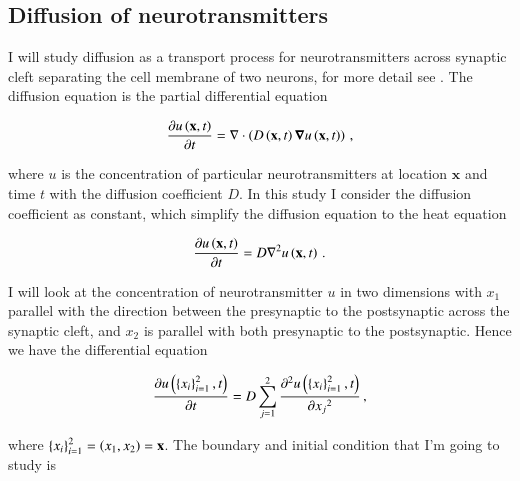 \documentclass[11pt,english,a4paper]{article}
\begin{document}
\maketitle
\begin{flushleft}

\begin{abstract}

\end{abstract}

\section{Diffusion of neurotransmitters}

I will study diffusion as a transport process for neurotransmitters  across synaptic cleft separating the cell membrane of two neurons, for more detail see \cite{project4}. The diffusion equation is the partial differential equation 

\begin{align*}
\frac{\partial u\left({\textbf{x},t}\right)}{\partial t} = \nabla \cdot\left({D\left({\textbf{x},t}\right)\boldsymbol{\nabla} u\left({\textbf{x},t}\right)}\right)\,,
\end{align*}

where $u$ is the concentration of particular neurotransmitters at location $\textbf{x}$ and time $t$ with the diffusion coefficient $D$. In this study I consider the diffusion coefficient as constant, which simplify the diffusion equation to the heat equation

\begin{align*}
\frac{\partial u\left({\textbf{x},t}\right)}{\partial t} = D\nabla^2 u\left({\textbf{x},t}\right)\,.
\end{align*}

I will look at the concentration of neurotransmitter $u$ in two dimensions with $x_1$ parallel with the direction between the presynaptic to the postsynaptic across the synaptic cleft, and $x_2$ is parallel with both presynaptic to the postsynaptic. Hence we have the differential equation

\begin{align}
\frac{\partial u\left({\left\lbrace{x_i}\right\rbrace_{i=1}^2,t}\right)}{\partial t} = D\sum_{j=1}^2\frac{\partial^2 u\left({\left\lbrace{x_i}\right\rbrace_{i=1}^2,t}\right)}{\partial {x_j}^2}\,,
\label{eq_1}
\end{align}

where $\left\lbrace{x_i}\right\rbrace_{i=1}^2 = \left({x_1, x_2}\right) = \textbf{x}$. The boundary and initial condition that I'm going to study is 


\end{flushleft}
\end{document}

